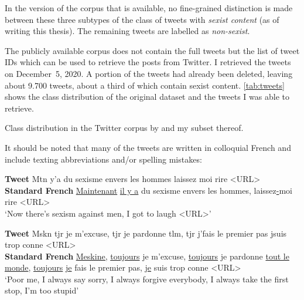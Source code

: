 In the version of the corpus that is available, no fine-grained distinction is made between these three subtypes of the class of tweets with \textit{sexist content} (as of writing this thesis).
The remaining tweets are labelled as \textit{non-sexist}.

The publicly available corpus does not contain the full tweets but the list of tweet IDs which can be used to retrieve the posts from Twitter.
I retrieved the tweets on December~5, 2020. 
A portion of the tweets had already been deleted, leaving about 9.700 tweets, about a third of which contain sexist content.
\autoref{tab:tweets} shows the class distribution of the original dataset and the tweets I was able to retrieve.


\begin{table}[tb]
\begin{center}

\end{center}
\caption{Class distribution in the Twitter corpus by \citet{chiril2020annotated} and my subset thereof.}
\label{tab:tweets}
\end{table}

It should be noted that many of the tweets are written in colloquial French and include texting abbreviations and/or spelling mistakes:


\begin{exe}
\ex 
\gll
\textbf{Tweet} Mtn y'a du sexisme envers les hommes {laissez moi} rire <URL>\\
\textbf{Standard French} \underline{Maintenant} \underline{il y a} du sexisme envers les hommes, laissez\underline{-}moi rire <URL> \\
\trans `Now there's sexism against men, I got to laugh <URL>'
\end{exe}

\begin{exe}
\ex 
\gll
\textbf{Tweet} 
Mskn tjr je m’excuse, tjr je pardonne tlm, tjr j’fais le premier pas jsuis trop conne <URL>
\\
\textbf{Standard French} 
\underline{Meskine,} \underline{toujours} je m’excuse, \underline{toujours} je pardonne \underline{tout le monde}, \underline{toujours} {\underline{je} fais} le premier pas, {\underline{je} suis} trop conne <URL>
 \\
\trans `Poor me, I always say sorry, I always forgive everybody, I always take the first stop, I'm too stupid'
\end{exe}

